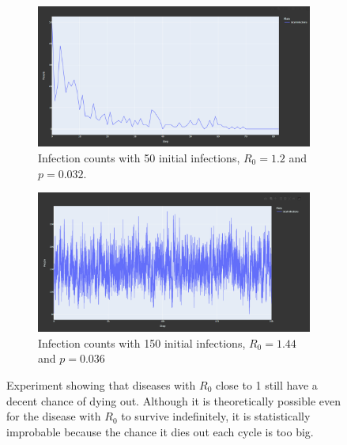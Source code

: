 \begin{figure}
    \centering
    \begin{subfigure}[b]{0.475\textwidth}
        \centering
        \includegraphics[width=\textwidth]{images/exp_big_r0_fail.png}
        \caption[Network2]%
        {{\small Infection counts with 50 initial infections, $R_0=1.2$ and $p = 0.032$.}}   
    \end{subfigure}
    \hfill
    \begin{subfigure}[b]{0.475\textwidth}  
        \centering 
        \includegraphics[width=\textwidth]{images/exp_big_r0_success.png}
        \caption[]%
        {{\small Infection counts with 150 initial infections, $R_0=1.44$ and $p = 0.036$}}    
    \end{subfigure}
    \caption[Experiment with an estimated $R_0$ of 0.64 and $R_0^1 = 1.12$]
    {\small Experiment showing that diseases with $R_0$ close to 1 still have a decent chance of dying out. Although it is theoretically possible even for the disease with $R_0$ to survive indefinitely, it is statistically improbable because the chance it dies out each cycle is too big.} 
    \label{fig:exp_r0_big}
\end{figure}

